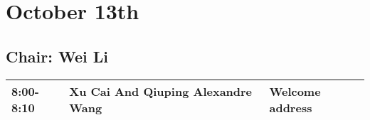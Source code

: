 \documentclass[oneside,A4paper,12pt]{article}
\begin{document}


\section*{October 13th}
\label{sec:org865c6a3}

\subsection*{Chair: Wei Li}
\label{sec:org60e80a9}
\begin{center}
\begin{tabular}{p{2.5cm}p{7.5cm}p{6.5cm}}
\toprule
\cellcolor{green!25}  8:00-8:10 & \cellcolor{green!25} Xu Cai And Qiuping Alexandre Wang & \cellcolor{green!25} Welcome address\\
\bottomrule
\end{tabular}
\end{center}
\end{document}
